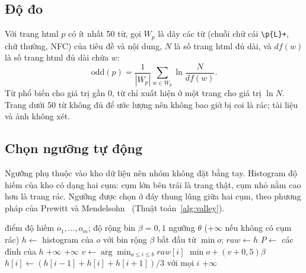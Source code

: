 \documentclass[12pt,a4paper]{report}
\begin{document}
\subsection{Độ đo}

Với trang html $p$ có ít nhất 50 từ, gọi $W_p$ là dãy các từ (chuỗi chữ cái \verb|\p{L}+|, chữ thường, NFC) của tiêu đề
và nội dung, $N$ là số trang html đủ dài, và $\mathit{df}(w)$ là số trang html đủ dài chứa $w$:
\begin{equation}
\mathrm{odd}(p) = \frac{1}{|W_p|}\sum_{w \in W_p} \ln\frac{N}{\mathit{df}(w)} .
\end{equation}
Từ phổ biến cho giá trị gần 0, từ chỉ xuất hiện ở một trang cho giá trị $\ln N$. Trang dưới 50 từ không đủ để ước lượng
nên không bao giờ bị coi là rác; tài liệu và ảnh không xét.

\subsection{Chọn ngưỡng tự động}

Ngưỡng phụ thuộc vào kho dữ liệu nên nhóm không đặt bằng tay. Histogram độ hiếm của kho có dạng hai cụm: cụm lớn bên
trái là trang thật, cụm nhỏ nằm cao hơn là trang rác. Ngưỡng được chọn ở đáy thung lũng giữa hai cụm, theo phương pháp
của Prewitt và Mendelsohn~\cite{prewitt1966} (Thuật toán~\ref{alg:valley}).

\begin{algorithm}[ht]
\caption{Chọn ngưỡng độ hiếm theo thung lũng của histogram}\label{alg:valley}
\begin{algorithmic}[1]
\Require điểm độ hiếm $o_1, \ldots, o_m$; độ rộng bin $\beta = 0{,}1$
\Ensure ngưỡng $\theta$ ($+\infty$ nếu không có cụm rác)
\State $h \gets$ histogram của $o$ với bin rộng $\beta$ bắt đầu từ $\min o$; $\mathit{raw} \gets h$
  \State $P \gets$ các đỉnh của $h$ 
   \Return $+\infty$ \EndIf
     \Return $+\infty$  \EndIf
    \State $v \gets \arg\min_{a \le i \le b} \mathit{raw}[i]$ 
     \Return $\min o + (v + 0{,}5)\beta$ \EndIf
  \EndIf
  \State $h[i] \gets (h[i-1] + h[i] + h[i+1]) / 3$ với mọi $i$ 
\EndFor
\State \Return $+\infty$
\end{algorithmic}
\end{algorithm}
\end{document}
